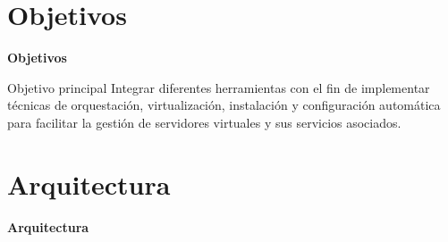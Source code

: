 \section{Objetivos}

\begin{frame}
    \Huge
    \centering
    \textbf{Objetivos}

\end{frame}

\begin{frame}{Objetivo principal}
    \vspace{0cm}
    Integrar diferentes herramientas con el fin de implementar técnicas de orquestación, virtualización, instalación y configuración automática para facilitar la gestión de servidores virtuales y sus servicios asociados.

\end{frame}

%
%


\section{Arquitectura}

\begin{frame}
    \Huge
    \centering
    \textbf{Arquitectura}

\end{frame}

